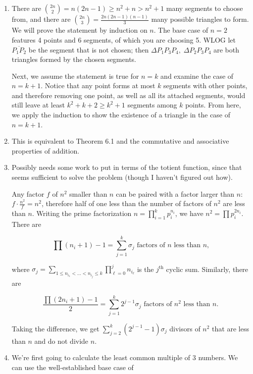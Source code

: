 \documentclass{book}
\numberwithin{equation}{section}
\begin{document}
\begin{enumerate}[label={6.\arabic*}]
\item
There are ${2n \choose 2} = n(2n-1) \geq n^2 + n > n^2 + 1$ many segments to choose from, and there
are ${2n \choose 3} = \frac{2n(2n-1)(n-1)}{3}$ many possible triangles to form. We will prove the statement
by induction on $n$. The base case of $n=2$ features 4 points and 6 segments, of which you are choosing 5.
WLOG let $\overline{P_1 P_2}$ be the segment that is not chosen; then $\Delta P_1 P_3 P_4, \; \Delta P_2 P_3 P_4$
are both triangles formed by the chosen segments.

Next, we assume the statement is true for $n=k$ and examine the case of $n=k+1$. Notice that any point forms
at most $k$ segments with other points, and therefore removing one point, as well as all its attached segments,
would still leave at least $k^2 + k + 2 \geq k^2 + 1$ segments among $k$ points. From here, we apply the induction
to show the existence of a triangle in the case of $n=k+1$.

\item
This is equivalent to Theorem 6.1 and the commutative and associative properties of addition.

\item
Possibly needs some work to put in terms of the totient function, since that seems sufficient to solve the
problem (though I haven't figured out how).

Any factor $f$ of $n^2$ smaller than $n$ can be paired with a factor larger than $n$: $f \cdot \frac{n^2}{f} = n^2$,
therefore half of one less than the number of factors of $n^2$ are less than $n$. Writing the prime factorization
$n = \prod_{i=1}^k p_i^{n_i}$, we have $n^2 = \prod p_i^{2n_i}$. There are

$$ \prod (n_i + 1) - 1 = \sum_{j=1}^k \sigma_j \text{ factors of $n$ less than $n$,}$$

where $\sigma_j = \sum_{1 \leq n_{i_1} < \ldots < n_{i_j} \leq k} \prod_{\ell = 0}^j n_{i_{\ell}}$ is the $j^{\text{th}}$
cyclic sum. Similarly, there are

$$ \frac{ \prod (2n_i + 1) - 1}{2} = \sum_{j=1}^k 2^{j-1}\sigma_j \text{ factors of $n^2$ less than $n$.}$$

Taking the difference, we get $\sum_{j=2}^k (2^{j-1}-1)\sigma_j$ divisors of $n^2$ that are less than $n$ and
do not divide $n$.

\item
We're first going to calculate the least common multiple of 3 numbers. We can use the
well-established base case of


\end{enumerate}
\end{document}
